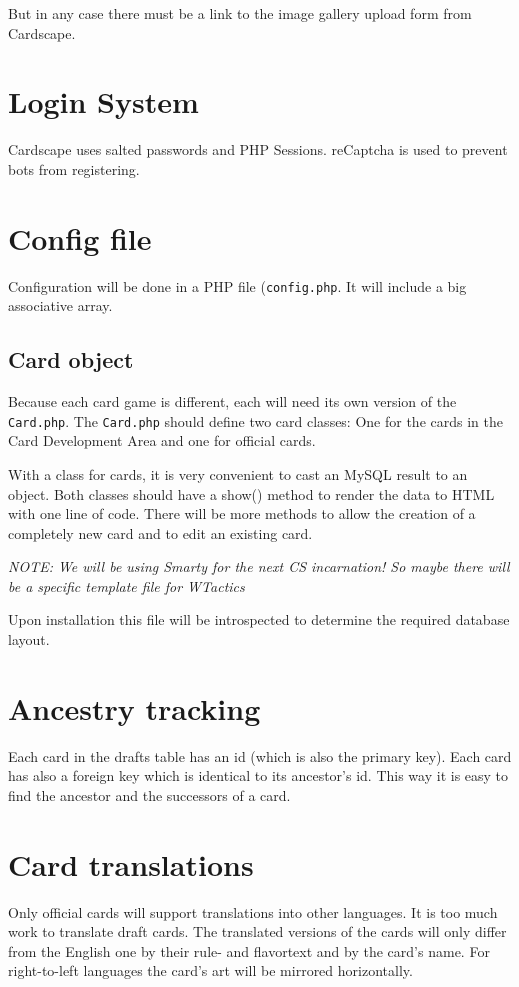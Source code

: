 \documentclass[a4paper, 11pt]{scrbook}
\begin{document}
But in any case there must be a link to the image gallery upload form from Cardscape.

\section{Login System}
Cardscape uses salted passwords and PHP Sessions. reCaptcha is used to prevent bots from registering.

\section{Config file}
Configuration will be done in a PHP file (\texttt{config.php}. It will include a big associative array.

\subsection{Card object}
Because each card game is different, each will need its own version of the \texttt{Card.php}. The \texttt{Card.php} should define two card classes: One for the cards in the Card Development Area and one for official cards.

With a class for cards, it is very convenient to cast an MySQL result to an object. Both classes should have a show() method to render the data to HTML with one line of code. There will be more methods to allow the creation of a completely new card and to edit an existing card.

\emph{NOTE: We will be using Smarty for the next CS incarnation! So maybe there will be a specific template file for WTactics}

Upon installation this file will be introspected to determine the required database layout.

\section{Ancestry tracking}
Each card in the drafts table has an id (which is also the primary key). Each card has also a foreign key which is identical to its ancestor's id. This way it is easy to find the ancestor and the successors of a card.

\section{Card translations}
Only official cards will support translations into other languages. It is too much work to translate draft cards. The translated versions of the cards will only differ from the English one by their rule- and flavortext and by the card's name. For right-to-left languages the card's art will be mirrored horizontally.
\end{document}
